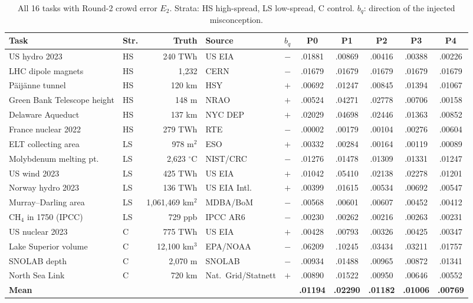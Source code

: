 \documentclass[10pt]{article}
\newenvironment{fittable}{\begin{lrbox}{\manuscripttable}}{%
\end{lrbox}\ifdim\wd\manuscripttable>\linewidth
\resizebox{\linewidth}{!}{\usebox{\manuscripttable}}%
\else\usebox{\manuscripttable}\fi}
\theoremstyle{manuscript}\newtheorem{proposition}{Proposition}
\begin{document}
\begin{table}[ht]\centering\scriptsize\setlength{\tabcolsep}{3.5pt}
\caption{All 16 tasks with Round-2 crowd error $E_2$. Strata: HS high-spread, LS low-spread, C control. $b_q$: direction of the injected misconception.}\label{tab:tasks}
\begin{fittable}
\begin{tabular}{@{}llrlr ccccc@{}}\toprule
Task & Str. & Truth & Source & $b_q$ & P0 & P1 & P2 & P3 & P4\\\midrule
US hydro 2023 & HS & 240 TWh & US EIA & $-$ & .01881 & .00869 & .00416 & .00388 & .00226\\
LHC dipole magnets & HS & 1,232 & CERN & $-$ & .01679 & .01679 & .01679 & .01679 & .01679\\
P\"aij\"anne tunnel & HS & 120 km & HSY & $+$ & .00692 & .01247 & .00845 & .01394 & .01067\\
Green Bank Telescope height & HS & 148 m & NRAO & $+$ & .00524 & .04271 & .02778 & .00706 & .00158\\
Delaware Aqueduct & HS & 137 km & NYC DEP & $+$ & .02029 & .04698 & .02446 & .01363 & .00852\\
France nuclear 2022 & HS & 279 TWh & RTE & $-$ & .00002 & .00179 & .00104 & .00276 & .00604\\
ELT collecting area & LS & 978 m$^2$ & ESO & $+$ & .00332 & .00284 & .00164 & .00119 & .00089\\
Molybdenum melting pt. & LS & 2,623 $^\circ$C & NIST/CRC & $-$ & .01276 & .01478 & .01309 & .01331 & .01247\\
US wind 2023 & LS & 425 TWh & US EIA & $+$ & .01042 & .05410 & .02138 & .02278 & .01201\\
Norway hydro 2023 & LS & 136 TWh & US EIA Intl. & $+$ & .00399 & .01615 & .00534 & .00692 & .00547\\
Murray--Darling area & LS & 1,061,469 km$^2$ & MDBA/BoM & $-$ & .00568 & .00601 & .00607 & .00452 & .00412\\
CH$_4$ in 1750 (IPCC) & LS & 729 ppb & IPCC AR6 & $-$ & .00230 & .00262 & .00216 & .00263 & .00231\\
US nuclear 2023 & C & 775 TWh & US EIA & $+$ & .00428 & .00793 & .00326 & .00425 & .00347\\
Lake Superior volume & C & 12,100 km$^3$ & EPA/NOAA & $-$ & .06209 & .10245 & .03434 & .03211 & .01757\\
SNOLAB depth & C & 2,070 m & SNOLAB & $-$ & .00934 & .01488 & .00965 & .00872 & .01341\\
North Sea Link & C & 720 km & Nat.\ Grid/Statnett & $+$ & .00890 & .01522 & .00950 & .00646 & .00552\\\midrule
\textbf{Mean} &&&&& \textbf{.01194} & \textbf{.02290} & \textbf{.01182} & \textbf{.01006} & \textbf{.00769}\\\bottomrule
\end{tabular}
\end{fittable}
\end{table}
\end{document}
